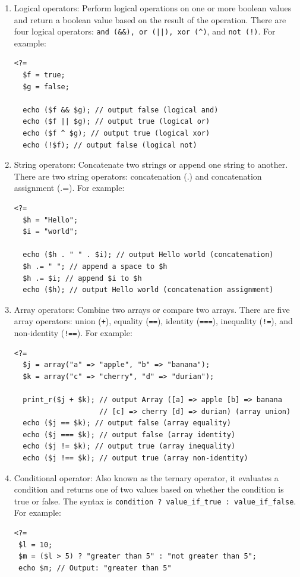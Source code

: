 \documentclass[11pt]{article}
\begin{document}
\begin{enumerate}
\item Logical operators: Perform logical operations on one or more boolean
values and return a boolean value based on the result of the
operation. There are four logical operators:
\texttt{and (\&\&), or (||), xor (\textasciicircum{})}, and \texttt{not (!)}. For example:

\begin{verbatim}
<?=
  $f = true;
  $g = false;

  echo ($f && $g); // output false (logical and)
  echo ($f || $g); // output true (logical or)
  echo ($f ^ $g); // output true (logical xor)
  echo (!$f); // output false (logical not)
\end{verbatim}

\item String operators: Concatenate two strings or append one string to
another. There are two string operators: concatenation (.) and
concatenation assignment (.=). For example:

\begin{verbatim}
<?=
  $h = "Hello";
  $i = "world";

  echo ($h . " " . $i); // output Hello world (concatenation)
  $h .= " "; // append a space to $h
  $h .= $i; // append $i to $h
  echo ($h); // output Hello world (concatenation assignment)
\end{verbatim}

\item Array operators: Combine two arrays or compare two arrays. There are
five array operators: union (\texttt{+}), equality (\texttt{==}), identity (\texttt{===}),
inequality (\texttt{!=}), and non-identity (\texttt{!==}). For example:

\begin{verbatim}
<?=
  $j = array("a" => "apple", "b" => "banana");
  $k = array("c" => "cherry", "d" => "durian");

  print_r($j + $k); // output Array ([a] => apple [b] => banana
                    // [c] => cherry [d] => durian) (array union)
  echo ($j == $k); // output false (array equality)
  echo ($j === $k); // output false (array identity)
  echo ($j != $k); // output true (array inequality)
  echo ($j !== $k); // output true (array non-identity)
\end{verbatim}

\item Conditional operator: Also known as the ternary operator, it
evaluates a condition and returns one of two values based on whether
the condition is true or false. The syntax is \texttt{condition ?
   value\_if\_true : value\_if\_false}. For example:

\begin{verbatim}
<?=
 $l = 10;
 $m = ($l > 5) ? "greater than 5" : "not greater than 5";
 echo $m; // Output: "greater than 5"
\end{verbatim}
\end{enumerate}
\end{document}
